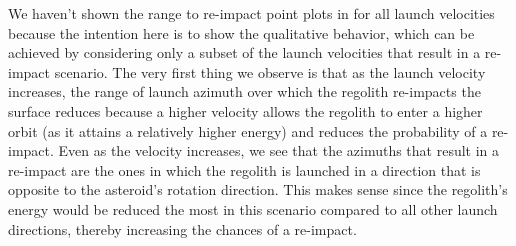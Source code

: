We haven't shown the range to re-impact point plots in  for all launch velocities because the intention here is to show the qualitative behavior, which can be achieved by considering only a subset of the launch velocities that result in a re-impact scenario. The very first thing we observe is that as the launch velocity increases, the range of launch azimuth over which the regolith re-impacts the surface reduces because a higher velocity allows the regolith to enter a higher orbit (as it attains a relatively higher energy) and reduces the probability of a re-impact. Even as the velocity increases, we see that the azimuths that result in a re-impact are the ones in which the regolith is launched in a direction that is opposite to the asteroid's rotation direction. This makes sense since the regolith's energy would be reduced the most in this scenario compared to all other launch directions, thereby increasing the chances of a re-impact.

